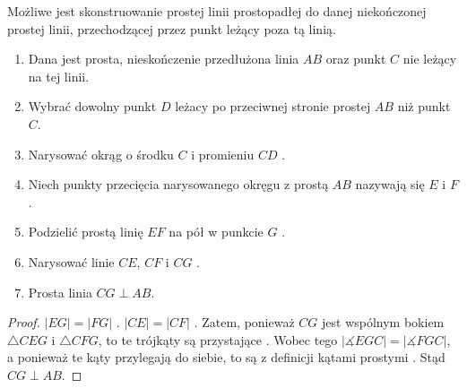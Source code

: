 \documentclass[12pt, a4paper]{scrartcl}
\begin{document}
\begin{theorem}
    Możliwe jest skonstruowanie prostej linii prostopadłej do danej niekończonej
    prostej linii, przechodzącej przez punkt leżący poza tą linią.

    \begin{enumerate}
        \item Dana jest prosta, nieskończenie przedłużona linia \(AB\) oraz
            punkt \(C\) nie leżący na tej linii.
        \item Wybrać dowolny punkt \(D\) leżacy po przeciwnej stronie prostej
            \(AB\) niż punkt \(C\).
        \item Narysować okrąg o środku \(C\) i promieniu \(CD\) .
        \item Niech punkty przecięcia narysowanego okręgu z prostą \(AB\)
            nazywają się \(E\) i \(F\).
        \item Podzielić prostą linię \(EF\) na pół w punkcie \(G\) .
        \item Narysować linie \(CE\), \(CF\) i \(CG\) .
        \item Prosta linia \(CG \perp AB\).
    \end{enumerate}

    \begin{figure}[!h]
        \begin{center}
        \end{center}
    \end{figure}

    \begin{proof}
        \(|EG| = |FG|\) . \(|CE| = |CF|\) . Zatem,
        ponieważ \(CG\) jest wspólnym bokiem \(\triangle CEG\) i \(\triangle
        CFG\), to te trójkąty są przystające . Wobec tego
        \(|\measuredangle EGC| = |\measuredangle FGC|\), a ponieważ te kąty
        przylegają do siebie, to są z definicji kątami prostymi .
        Stąd \(CG \perp AB\).
    \end{proof}
\end{theorem}
\end{document}

